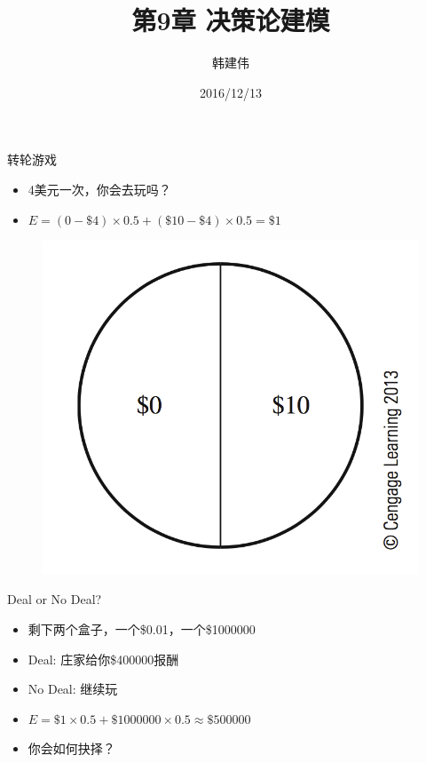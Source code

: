\documentclass[mathserif, table]{beamer}
\title{第9章 决策论建模}
\author{韩建伟}
\institute{
  信息学院\\
  \texttt{mm@hanjianwei.com}
}
\date{2016/12/13}
\begin{document}
\begin{frame}[plain]
  \titlepage{}
\end{frame}

\begin{frame}{转轮游戏}

  \begin{itemize}
  \item<1-> 4美元一次，你会去玩吗？
  \item<2-> $E = (0-\$4) \times 0.5 + (\$10 - \$4) \times 0.5 = \$1$
  \end{itemize}

  \begin{figure}
    \centering
    \includegraphics[height=.4\textheight{}]{9_1.png}
  \end{figure}
  
\end{frame}

\begin{frame}{Deal or No Deal?}

  \begin{itemize}
  \item<1-> 剩下两个盒子，一个\$0.01，一个\$1000000
  \item<1-> Deal: 庄家给你\$400000报酬
  \item<1-> No Deal: 继续玩
  \item<2-> $E = \$1 \times 0.5 + \$1000000 \times 0.5 \approx \$500000$
  \item<3-> 你会如何抉择？
  \end{itemize}
  
\end{frame}
\end{document}
